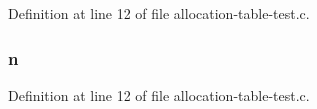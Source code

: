 Definition at line 12 of file allocation-\/table-\/test.\-c.

\hypertarget{allocation-table-test_8c_a24010dade8ebab3f87a48022772cd975}{
\subsubsection[{n}]{ n}}\label{allocation-table-test_8c_a24010dade8ebab3f87a48022772cd975}


Definition at line 12 of file allocation-\/table-\/test.\-c.

